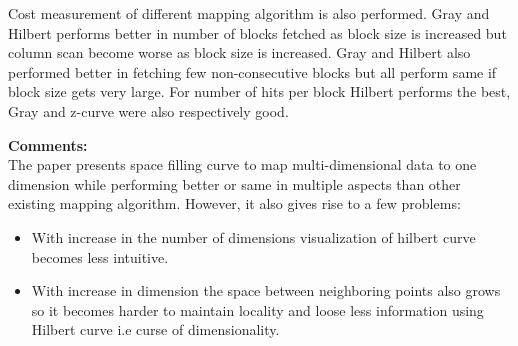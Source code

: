 \documentclass[a4paper,12pt, twoside]{article}
\begin{document}
Cost measurement of different mapping algorithm is also performed. Gray and Hilbert performs better in number of blocks fetched as block size is increased but column scan become worse as block size is increased. Gray and Hilbert also performed better in fetching few non-consecutive blocks but all perform same if block size gets very large. For number of hits per block Hilbert performs the best, Gray and z-curve were also respectively good.
 
\textbf{Comments:}\\
The paper presents space filling curve to map multi-dimensional data to one dimension while performing better or same in multiple aspects than other existing mapping algorithm. However, it also gives rise to a few problems:
\begin{itemize}
	\item With increase in the number of dimensions visualization of hilbert curve becomes less intuitive.
	
	\item With increase in dimension the space between neighboring points also grows so it becomes harder to maintain locality and loose less information using Hilbert curve i.e curse of dimensionality.
\end{itemize}
\end{document}
